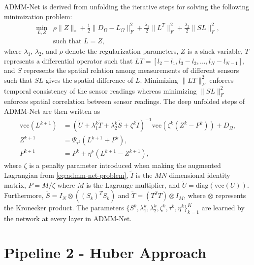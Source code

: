 ADMM-Net is derived from unfolding the iterative steps for solving the following minimization problem:
\begin{equation}
\begin{aligned}
\min_{L,Z} & \rho \|Z\|_* + \frac{1}{2} \|D_{\Omega} - L_{\Omega}\|_F^2 + \frac{\lambda_1}{2} \|L^T\|_F^2 + \frac{\lambda_2}{2} \|SL\|_F^2, \\
& \text{such that } L = Z, \label{eq:admm-net-problem}
\end{aligned}
\end{equation}
where $\lambda_1$, $\lambda_2$, and $\rho$ denote the regularization parameters, $Z$ is a slack variable, $T$ represents a differential operator \cite{mao2018spatio} such that $LT = [l_2 - l_1, l_3 - l_2, ..., l_N - l_{N-1}]$, and $S$ represents the spatial relation among measurements of different sensors \cite{mao2018spatio} such that $SL$ gives the spatial difference of $L$. Minimizing $\|LT\|_F^2$ enforces temporal consistency of the sensor readings whereas minimizing $\|SL\|_F^2$ enforces spatial correlation between sensor readings. The deep unfolded steps of ADMM-Net are then written as
\begin{align}
\text{vec}(L^{k+1}) &= (\tilde{U} + \lambda^k_1\tilde{T} + \lambda^k_2\tilde{S} + \zeta^k\tilde{I})^{-1} \text{vec}(\zeta^k(Z^k - P^k)) + D_{\Omega}, \label{eq:admm-net-step1} \\
Z^{k+1} &= \Psi_{\tau^k} \left( L^{k+1} + P^k \right), \label{eq:admm-net-step2} \\
P^{k+1} &= P^k + \eta^k (L^{k+1} - Z^{k+1}), \label{eq:admm-net-step3}
\end{align}
where $\zeta$ is a penalty parameter introduced when making the augmented Lagrangian from \ref{eq:admm-net-problem}, $\tilde{I}$ is the $MN$ dimensional identity matrix, $P = M/\zeta$ where $M$ is the Lagrange multiplier, and $\tilde{U} = \text{diag}(\text{vec}(U))$. Furthermore, $\tilde{S} = I_N \otimes ((S_k)^T S_k)$ and $\tilde{T} = (T^T T) \otimes {I_M}$, where $\otimes$ represents the Kronecker product. The parameters $\{S^k, \lambda^k_1, \lambda^k_2, \zeta^k, \tau^k, \eta^k\}_{k=1}^K$ are learned by the network at every layer in ADMM-Net.

\section{Pipeline 2 - Huber Approach}

